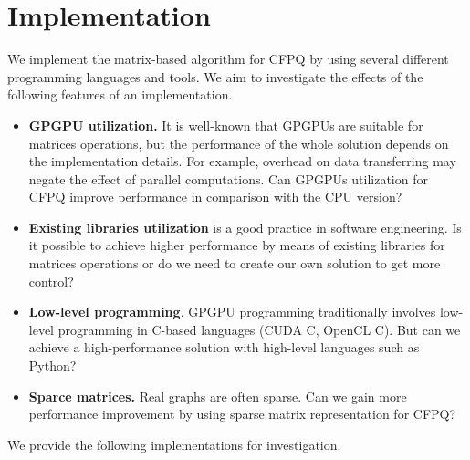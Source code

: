 \section{Implementation}

We implement the matrix-based algorithm for CFPQ by using several different programming languages and tools.
We aim to investigate the effects of the following features of an implementation.
\begin{itemize}
\item \textbf{GPGPU utilization.}
It is well-known that GPGPUs are suitable for matrices operations, but the performance of the whole solution depends on the implementation details. For example, overhead on data transferring may negate the effect of parallel computations.
Can GPGPUs utilization for CFPQ improve performance in comparison with the CPU version?

\item \textbf{Existing libraries utilization} is a good practice in software engineering.
Is it possible to achieve higher performance by means of existing libraries for matrices operations or do we need to create our own solution to get more control?

\item \textbf{Low-level programming}.
GPGPU programming traditionally involves low-level programming in C-based languages (CUDA C, OpenCL C).
But can we achieve a high-performance solution with high-level languages such as Python?

\item \textbf{Sparce matrices.} Real graphs are often sparse.
Can we gain more performance improvement by using sparse matrix representation for CFPQ?

\end{itemize}

We provide the following implementations for investigation.


